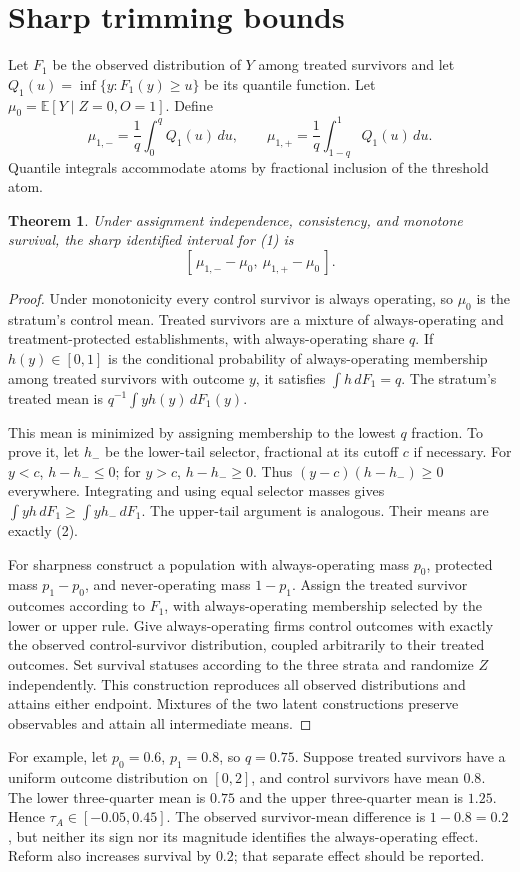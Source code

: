 \documentclass[11pt,a4paper]{article}
\newtheorem{theorem}{Theorem}[section]
\newcommand{\E}{\mathbb E}
\begin{document}
\section{Sharp trimming bounds}
Let $F_1$ be the observed distribution of $Y$ among treated survivors and let $Q_1(u)=\inf\{y:F_1(y)\ge u\}$ be its quantile function. Let $\mu_0=\E[Y\mid Z=0,O=1]$. Define
\[
 \mu_{1,-}=\frac1q\int_0^qQ_1(u)\,du,\qquad
 \mu_{1,+}=\frac1q\int_{1-q}^1Q_1(u)\,du.
 \tag{2}
\]
Quantile integrals accommodate atoms by fractional inclusion of the threshold atom.
\begin{theorem}
Under assignment independence, consistency, and monotone survival, the sharp identified interval for (1) is
\[
 [\,\mu_{1,-}-\mu_0,\ \mu_{1,+}-\mu_0\,].
 \tag{3}
\]
\end{theorem}
\begin{proof}
Under monotonicity every control survivor is always operating, so $\mu_0$ is the stratum's control mean. Treated survivors are a mixture of always-operating and treatment-protected establishments, with always-operating share $q$. If $h(y)\in[0,1]$ is the conditional probability of always-operating membership among treated survivors with outcome $y$, it satisfies $\int h\,dF_1=q$. The stratum's treated mean is $q^{-1}\int yh(y)\,dF_1(y)$.

This mean is minimized by assigning membership to the lowest $q$ fraction. To prove it, let $h_-$ be the lower-tail selector, fractional at its cutoff $c$ if necessary. For $y<c$, $h-h_-\le0$; for $y>c$, $h-h_-\ge0$. Thus $(y-c)(h-h_-)\ge0$ everywhere. Integrating and using equal selector masses gives $\int yh\,dF_1\ge\int yh_-\,dF_1$. The upper-tail argument is analogous. Their means are exactly (2).

For sharpness construct a population with always-operating mass $p_0$, protected mass $p_1-p_0$, and never-operating mass $1-p_1$. Assign the treated survivor outcomes according to $F_1$, with always-operating membership selected by the lower or upper rule. Give always-operating firms control outcomes with exactly the observed control-survivor distribution, coupled arbitrarily to their treated outcomes. Set survival statuses according to the three strata and randomize $Z$ independently. This construction reproduces all observed distributions and attains either endpoint. Mixtures of the two latent constructions preserve observables and attain all intermediate means.
\end{proof}
For example, let $p_0=0.6$, $p_1=0.8$, so $q=0.75$. Suppose treated survivors have a uniform outcome distribution on $[0,2]$, and control survivors have mean $0.8$. The lower three-quarter mean is $0.75$ and the upper three-quarter mean is $1.25$. Hence $\tau_A\in[-0.05,0.45]$. The observed survivor-mean difference is $1-0.8=0.2$, but neither its sign nor its magnitude identifies the always-operating effect. Reform also increases survival by $0.2$; that separate effect should be reported.
\end{document}
